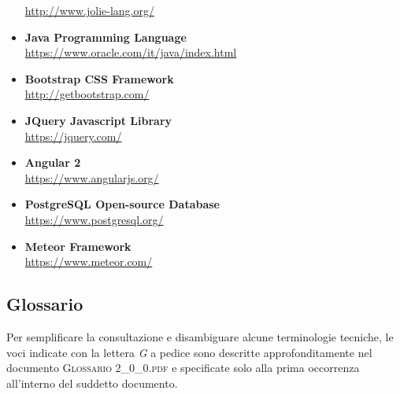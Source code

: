 \begin{itemize}
	\url{http://www.jolie-lang.org/}
	\item \textbf{Java Programming Language}\\
	\url{https://www.oracle.com/it/java/index.html}
	\item \textbf{Bootstrap CSS Framework}\\
	\url{http://getbootstrap.com/}
	\item \textbf{JQuery Javascript Library}\\
	\url{https://jquery.com/}
	\item \textbf{Angular 2}\\
	\url{https://www.angularjs.org/}
	\item \textbf{PostgreSQL Open-source Database}\\
	\url{https://www.postgresql.org/}
	\item \textbf{Meteor Framework}\\
	\url{https://www.meteor.com/}
\end{itemize}

\subsection{Glossario}
Per semplificare la consultazione e disambiguare alcune terminologie tecniche, le voci indicate con la lettera \textit{G} a pedice sono descritte approfonditamente nel documento \textsc{Glossario 2\_0\_0.pdf} e specificate solo alla prima occorrenza all'interno del suddetto documento.